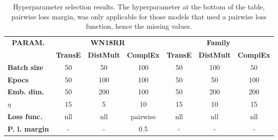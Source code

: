 \begin{table}[htbp]
\centering
\begin{tabular}{|l||ccc||ccc|}
\hline
\multicolumn{1}{|c||}{\multirow{2}{*}{\textbf{PARAM.}}} & \multicolumn{3}{c||}{\textbf{WN18RR}}                                                                                  & \multicolumn{3}{c|}{\textbf{Family}}                                                                                  \\ \cline{2-7} 
\multicolumn{1}{|c||}{}                                 & \multicolumn{1}{c|}{\textbf{TransE}} & \multicolumn{1}{c|}{\textbf{DistMult}} & \multicolumn{1}{c||}{\textbf{ComplEx}} & \multicolumn{1}{c|}{\textbf{TransE}} & \multicolumn{1}{c|}{\textbf{DistMult}} & \multicolumn{1}{c|}{\textbf{ComplEx}} \\ \hline
\textbf{Batch size}                                 & 50                                   & 50                                     & 100                                   & 50                                   & 100                                    & 50                                    \\
\textbf{Epocs}                                         & 50                                   & 100                                    & 100                                   & 50                                   & 50                                     & 100                                   \\
\textbf{Emb. dim.}                                     & 50                                   & 200                                    & 100                                   & 50                                   & 200                                    & 200                                   \\
\textbf{$\eta$}                           & 15                                   & 5                                      & 10                                    & 15                                   & 10                                     & 15                                    \\
\textbf{Loss func.}                                 & nll                                  & nll                                    & pairwise                              & nll                                  & nll                                    & nll                                   \\
\textbf{P. l. margin}                                & -                                    & -                                      & 0.5                                   & -                                    & -                                      & -                                    \\ \hline
\end{tabular}
\caption[Hyperparameter selection results]{Hyperparameter selection results. The hyperparameter at the bottom of the table, pairwise loss margin, was only applicable for those models that used a pairwise loss function, hence the missing values.}
\label{hyperparameter_selection_results}
\end{table}


